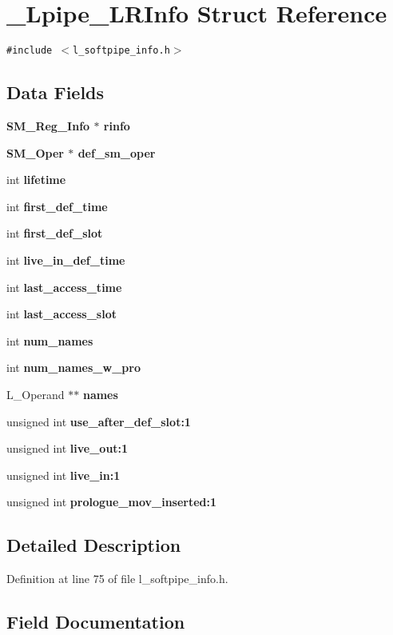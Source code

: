 \section{\_\-Lpipe\_\-LRInfo Struct Reference}
\label{struct__Lpipe__LRInfo}
{\tt \#include $<$l\_\-softpipe\_\-info.h$>$}

\subsection*{Data Fields}
\begin{CompactItemize}
\item 
\bf{SM\_\-Reg\_\-Info} $\ast$ \bf{rinfo}
\item 
\bf{SM\_\-Oper} $\ast$ \bf{def\_\-sm\_\-oper}
\item 
int \bf{lifetime}
\item 
int \bf{first\_\-def\_\-time}
\item 
int \bf{first\_\-def\_\-slot}
\item 
int \bf{live\_\-in\_\-def\_\-time}
\item 
int \bf{last\_\-access\_\-time}
\item 
int \bf{last\_\-access\_\-slot}
\item 
int \bf{num\_\-names}
\item 
int \bf{num\_\-names\_\-w\_\-pro}
\item 
L\_\-Operand $\ast$$\ast$ \bf{names}
\item 
unsigned int \bf{use\_\-after\_\-def\_\-slot}:1
\item 
unsigned int \bf{live\_\-out}:1
\item 
unsigned int \bf{live\_\-in}:1
\item 
unsigned int \bf{prologue\_\-mov\_\-inserted}:1
\end{CompactItemize}


\subsection{Detailed Description}




Definition at line 75 of file l\_\-softpipe\_\-info.h.

\subsection{Field Documentation}
